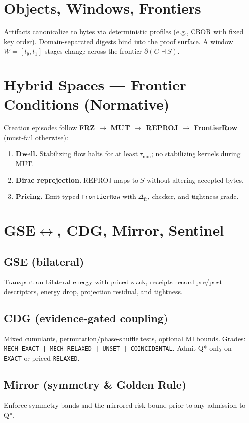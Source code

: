 \documentclass[11pt]{article}
\begin{document}
\section{Objects, Windows, Frontiers}
Artifacts canonicalize to bytes via deterministic profiles (e.g., CBOR with fixed key order). Domain-separated digests bind into the proof surface. A window $W=[t_0,t_1]$ stages change across the frontier $\partial(G \dashv S)$.

\section{Hybrid Spaces — Frontier Conditions (Normative)}
Creation episodes follow \textbf{FRZ $\rightarrow$ MUT $\rightarrow$ REPROJ $\rightarrow$ FrontierRow} (must-fail otherwise):
\begin{enumerate}[leftmargin=1.3em,label=(F\arabic*)]
\item \textbf{Dwell.} Stabilizing flow halts for at least $\tau_{\min}$; no stabilizing kernels during MUT.
\item \textbf{Dirac reprojection.} REPROJ maps to $S$ without altering accepted bytes.
\item \textbf{Pricing.} Emit typed \texttt{FrontierRow} with $\Delta_{\mathrm{fr}}$, checker, and tightness grade.
\end{enumerate}

\section{GSE\texorpdfstring{$\leftrightarrow$}{↔}, CDG, Mirror, Sentinel}
\subsection*{GSE (bilateral)}
Transport on bilateral energy with priced slack; receipts record pre/post descriptors, energy drop, projection residual, and tightness.

\subsection*{CDG (evidence-gated coupling)}
Mixed cumulants, permutation/phase-shuffle tests, optional MI bounds. Grades: \texttt{MECH\_EXACT | MECH\_RELAXED | UNSET | COINCIDENTAL}. Admit Q* only on \texttt{EXACT} or priced \texttt{RELAXED}.

\subsection*{Mirror (symmetry \& Golden Rule)}
Enforce symmetry bands and the mirrored-risk bound prior to any admission to Q*.
\end{document}
